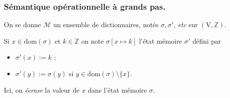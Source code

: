 \documentclass[../main]{subfiles}
\begin{document}
  \subsubsection{Sémantique opérationnelle à grands pas.}

  \begin{defn}
    On se donne $\mathcal{M}$ un ensemble de dictionnaires, notés $\sigma, \sigma'$, \textit{etc} sur $(\mathrm{V}, \mathds{Z})$.

    Si $x \in \mathrm{dom}(\sigma)$ et $k \in \mathds{Z}$ on note $\sigma [x \mapsto k]$ l'état mémoire $\sigma'$ défini par 
     \begin{itemize}
      \item $\sigma'(x) := k$ ;
      \item  $\sigma'(y) := \sigma(y)$ si  $y \in \mathrm{dom}(\sigma) \setminus \{x\}$.
    \end{itemize}

    Ici, on \textit{écrase} la valeur de $x$ dans l'état mémoire $\sigma$.
  \end{defn}
\end{document}
